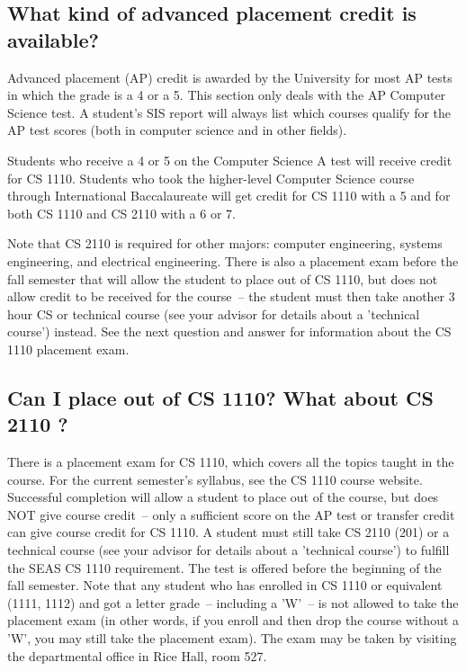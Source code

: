 \documentclass[10pt,letter]{book}
\begin{document}
\subsection{What kind of advanced placement credit is available?}
\label{applacement}

Advanced placement (AP) credit is awarded by the University for most
AP tests in which the grade is a 4 or a 5. This section only deals
with the AP Computer Science test. A student's SIS report will
always list which courses qualify for the AP test scores (both in
computer science and in other fields).

Students who receive a 4 or 5 on the Computer Science A test will
receive credit for CS 1110.  Students who took the higher-level Computer
Science course through International Baccalaureate will get credit for
CS 1110 with a 5 and for both CS 1110 and CS 2110 with a 6 or 7.

Note that CS 2110 is required for other majors: computer engineering,
systems engineering, and electrical engineering. There is also a
placement exam before the fall semester that will allow the student to
place out of CS 1110, but does not allow credit to be received for the
course~-- the student must then take another 3 hour CS or technical
course (see your advisor for details about a 'technical course')
instead. See the next question and answer for information about the CS
1110 placement exam.

\subsection{Can I place out of CS 1110? What about CS 2110 ?}
\label{101placement}

There is a placement exam for CS 1110, which covers all the
topics taught in the course. For the current semester's syllabus, see
the CS 1110 course website. Successful completion will allow a
student to place out of the course, but does NOT give course credit~--
only a sufficient score on the AP test or transfer credit can give
course credit for CS 1110. A student must still take CS 2110
(201) or a technical course (see your advisor for details about a
'technical course') to fulfill the SEAS CS 1110 requirement. The
test is offered before the beginning of the fall semester. Note that
any student who has enrolled in CS 1110 or equivalent (1111,
1112) and got a letter grade~-- including a 'W'~-- is not allowed to
take the placement exam (in other words, if you enroll and then drop
the course without a 'W', you may still take the placement exam). The
exam may be taken by visiting the departmental office in Rice Hall,
room 527.
\end{document}
